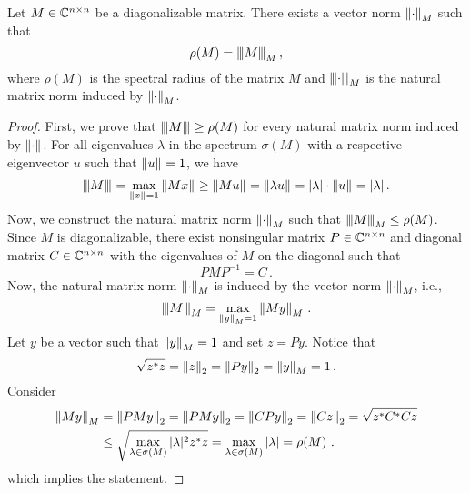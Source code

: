 \begin{theo}
\label{thm:norm}
Let $M\in\CC^{n\times n}$ be a diagonalizable matrix. There exists a vector norm $\norm{\cdot}{M}$ such that 
$$
\rho(M)=\Mnorm{M}{M}\,,
$$
where $\rho(M)$ is the spectral radius of the matrix $M$ and $\Mnorm{\cdot}{M}$ is the natural matrix norm induced by $\norm{\cdot}{M}$.
\end{theo}
\begin{proof}
First, we prove that $\Mnorm{M}{}\geq\rho(M)$ for every natural matrix norm induced by $\norm{\cdot}{}$. For all eigenvalues $\lambda$ in the spectrum $\sigma(M)$ with a respective eigenvector $u$ such that $\norm{u}{}=1$, we have
$$
\Mnorm{M}{}=\max_{\norm{x}{}=1} \norm{Mx}{}\geq \norm{Mu}{}=\norm{\lambda u}{}=|\lambda|\cdot\norm{u}{}=|\lambda|\,.
$$
Now, we construct the natural matrix norm $\norm{\cdot}{M}$ such that $\Mnorm{M}{M}\leq\rho(M)$. Since $M$ is diagonalizable, there exist nonsingular matrix $P\in\CC^{n\times n}$ and diagonal matrix $C\in\CC^{n\times n}$ with the eigenvalues of $M$ on the diagonal such that 
$$
PMP^{-1}=C\,.
$$ 
Now, the natural matrix norm $\norm{\cdot}{M}$ is induced by the vector norm $\norm{\cdot}{M}$, i.e.,
$$
\Mnorm{M}{M}=\max_{\norm{y}{M}=1} \norm{My}{M}\,.
$$
Let $y$ be a  vector such that $\norm{y}{M}=1$ and set $z=Py$. Notice that 
$$
\sqrt{z^*z}=\norm{z}{2}=\norm{Py}{2}=\norm{y}{M}=1\,.
$$
Consider
\begin{align*}
\norm{My}{M}&=\norm{PMy}{2}=\norm{PMy}{2}=\norm{CPy}{2}=\norm{Cz}{2}=\sqrt{z^*C^*Cz}\\
    &\leq \sqrt{\max_{\lambda\in\sigma(M)}|\lambda|^2 z^*z}=\max_{\lambda\in\sigma(M)}|\lambda|=\rho(M)\,\,.
\end{align*}
which implies the statement.
\end{proof}

